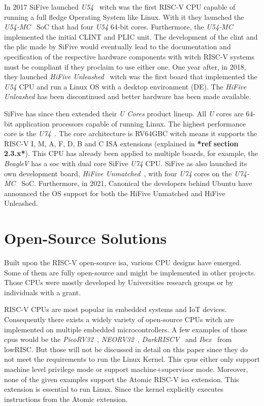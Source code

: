 In 2017 SiFive launched \textit{U54}~\cite{u54} witch was the first RISC-V CPU capable of running a full fledge Operating System like Linux. With it they launched the \textit{U54-MC}~\cite{u54-mc} SoC that had four \textit{U54} 64-bit cores. Furthermore, the \textit{U54-MC} implemented the initial CLINT and PLIC unit. The development of the \acrshort{clint} and the \acrshort{plic} made by SiFive would eventually lead to the documentation and specification of the respective hardware components with witch RISC-V systems must be compliant if they proclaim to use either one. One year after, in 2018, they launched \textit{HiFive Unleashed}~\cite{hifive_unleashed} witch was the first board that implemented the \textit{U54} CPU and run a Linux OS with a desktop environment (DE). The \textit{HiFive Unleashed} has been discontinued and better hardware has been made available.

SiFive has since then extended their \textit{U Cores} product lineup. All \textit{U} cores are 64-bit application processors capable of running Linux. The highest performance core is the \textit{U74}~\cite{u74}. The core architecture is RV64GBC witch means it supports the RISC-V I, M, A, F, D, B and C ISA extensions (explained in \textbf{*ref section 2.3.x*}). This CPU has already been applied to multiple boards, for example, the \textit{BeagleV} has a \acrshort{soc} with dual core SiFive \textit{U74} CPU. SiFive as also launched its own development board, \textit{HiFive Unmatched}~\cite{hifive_unmatched}, with four \textit{U74} cores on the \textit{U74-MC}~\cite{u74-mc} SoC. Furthermore, in 2021, Canonical the developers behind Ubuntu have announced the OS support for both the HiFive Unmatched and HiFive Unleashed.

\section{Open-Source Solutions}
Built upon the RISC-V open-source \acrlong{isa}, various CPU designs have emerged. Some of them are fully open-source and might be implemented in other projects. Those CPUs were mostly developed by Universities research groups or by individuals with a grant. 

RISC-V CPUs are most popular in embedded systems and IoT devices. Consequently there exists a widely variety of open-source CPUs witch are implemented on multiple embedded microcontrollers. A few examples of those \acrshort{cpu}s would be the \textit{PicoRV32}~\cite{picorv32}, \textit{NEORV32}~\cite{neorv32}, \textit{DarkRISCV}~\cite{darkriscv} and \textit{Ibex}~\cite{ibex} from lowRISC. But those will not be discussed in detail on this paper since they do not meet the requirements to run the Linux Kernel. This \acrshort{cpu}s either only support \acrfull{machine} level privilege mode or support \acrfull{machine}+\acrfull{supervisor} mode. Moreover, none of the given examples support the Atomic RISC-V \acrshort{isa} extension. This extension is essential to run Linux. Since the kernel explicitly executes instructions from the Atomic extension. 

